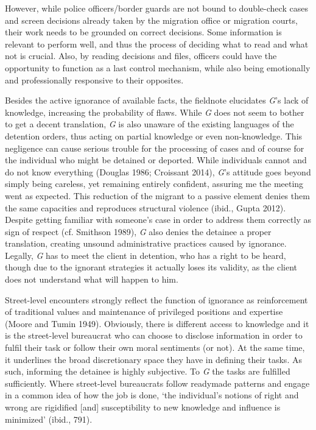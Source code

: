 \par
However, while police officers/border guards are not bound to double-check cases and screen decisions already taken by the migration office or migration courts, their work needs to be grounded on correct decisions. Some information is relevant to perform well, and thus the process of deciding what to read and what not is crucial. Also, by reading decisions and files, officers could have the opportunity to function as a last control mechanism, while also being emotionally and professionally responsive to their opposites.
\par
Besides the active ignorance of available facts, the fieldnote elucidates \emph{G}’s lack of knowledge, increasing the probability of flaws. While \emph{G} does not seem to bother to get a decent translation, \emph{G} is also unaware of the existing languages of the detention orders, thus acting on partial knowledge or even non-knowledge. This negligence can cause serious trouble for the processing of cases and of course for the individual who might be detained or deported. While individuals cannot and do not know everything (Douglas 1986; Croissant 2014), \emph{G}’s attitude goes beyond simply being careless, yet remaining entirely confident, assuring me the meeting went as expected. This reduction of the migrant  to a passive element denies them the same capacities and reproduces structural violence (ibid., Gupta 2012). Despite getting familiar with someone’s case in order to address them correctly as sign of respect (cf. Smithson 1989), \emph{G} also denies the detainee a proper translation, creating unsound administrative practices caused by ignorance. Legally, \emph{G} has to meet the client in detention, who has a right to be heard, though due to the ignorant strategies it actually loses its validity, as the client does not understand what will happen to him.
\par
Street-level encounters strongly reflect the function of ignorance as reinforcement of traditional values and maintenance of privileged positions and expertise (Moore and Tumin 1949). Obviously, there is different access to knowledge and it is the street-level bureaucrat who can choose to disclose information in order to fulfil their task or follow their own moral sentiments (or not). At the same time, it underlines the broad discretionary space they have in defining their tasks. As such, informing the detainee is highly subjective. To \emph{G} the tasks are fulfilled sufficiently. Where street-level bureaucrats follow readymade patterns and engage in a common idea of how the job is done, ‘the individual’s notions of right and wrong are rigidified [and] susceptibility to new knowledge and influence is minimized’ (ibid., 791).
